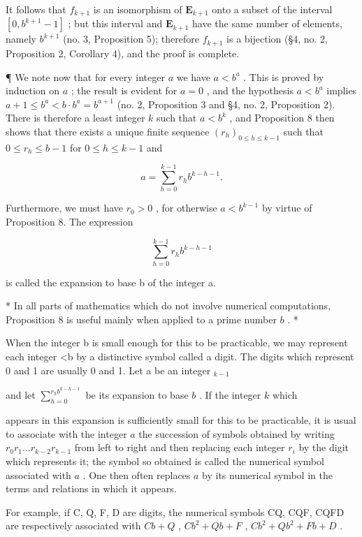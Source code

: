It follows that \(f_{k+1}\) is an isomorphism of \(\mathbf{E}_{k+1}\) onto a subset of the interval \([0, b^{k+1} - 1]\) ; but this interval and \(\mathbf{E}_{k+1}\) have the same number of elements, namely \(b^{k+1}\) (no. 3, Proposition 5); therefore \(f_{k+1}\) is a bijection (§4, no. 2, Proposition 2, Corollary 4), and the proof is complete.

¶ We note now that for every integer \(a\) we have \(a < b^a\) . This is proved by induction on \(a\) ; the result is evident for \(a = 0\) , and the hypothesis \(a < b^a\) implies \(a + 1 \leqslant b^a < b \cdot b^a = b^{a+1}\) (no. 2, Proposition 3 and §4, no. 2, Proposition 2). There is therefore a least integer \(k\) such that \(a < b^k\) , and Proposition 8 then shows that there exists a unique finite sequence \((r_h)_{0 \leqslant h \leqslant k-1}\) such that \(0 \leqslant r_h \leqslant b - 1\) for \(0 \leqslant h \leqslant k - 1\) and

\[
a = \sum_ {h = 0} ^ {k - 1} r _ {h} b ^ {k - h - 1}.
\]

Furthermore, we must have \(r_{0} > 0\) , for otherwise \(a < b^{k-1}\) by virtue of Proposition 8. The expression

\[
\sum_ {h = 0} ^ {k - 1} r _ {h} b ^ {k - h - 1}
\]

is called the expansion to base b of the integer a.

* In all parts of mathematics which do not involve numerical computations, Proposition 8 is useful mainly when applied to a prime number \(b\) . *

When the integer b is small enough for this to be practicable, we may represent each integer \textless b by a distinctive symbol called a digit. The digits which represent 0 and 1 are usually 0 and 1. Let a be an integer \(_{k-1}\)

and let \(\sum_{h=0}^{r_h b^{k-h-1}}\) be its expansion to base \(b\) . If the integer \(k\) which

appears in this expansion is sufficiently small for this to be practicable, it is usual to associate with the integer \(a\) the succession of symbols obtained by writing \(r_0r_1 \ldots r_{k-2}r_{k-1}\) from left to right and then replacing each integer \(r_i\) by the digit which represents it; the symbol so obtained is called the numerical symbol associated with \(a\) . One then often replaces \(a\) by its numerical symbol in the terms and relations in which it appears.

For example, if C, Q, F, D are digits, the numerical symbols CQ, CQF, CQFD are respectively associated with \(Cb + Q\) , \(Cb^{2} + Qb + F\) , \(Cb^{2} + Qb^{2} + Fb + D\) .

